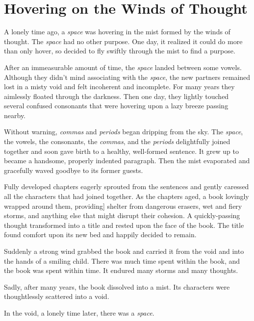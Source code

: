 \chapter{Hovering on the Winds of Thought}
\setlength{\parindent}{2em}
\LARGE
{}\baselineskip

A lonely time ago, a \textit{space} was hovering in the mist formed by the winds of thought. The \textit{space} had no other purpose. One day, it realized it could do more than only hover, so decided to fly swiftly through the mist to find a purpose.

After an immeasurable amount of time, the \textit{space} landed between some vowels. Although they didn't mind associating with the \textit{space}, the new partners remained lost in a misty void and felt incoherent and incomplete. For many years they aimlessly floated through the darkness. Then one day, they lightly touched several confused consonants that were hovering upon a lazy breeze passing nearby.

Without warning, \textit{commas} and \textit{periods} began dripping from the sky. The \textit{space}, the vowels, the consonants, the \textit{commas}, and the \textit{periods} delightfully joined together and soon gave birth to a healthy, well-formed sentence. It grew up to became a handsome, properly indented paragraph. Then the mist evaporated and gracefully waved goodbye to its former guests.

Fully developed chapters eagerly sprouted from the sentences and gently caressed all the characters that had joined together. As the chapters aged, a book lovingly wrapped around them, providing] shelter from dangerous erasers, wet and fiery storms, and anything else that might disrupt their cohesion. A quickly-passing thought transformed into a title and rested upon the face of the book. The title found comfort upon its new bed and happily decided to remain.

Suddenly a strong wind grabbed the book and carried it from the void and into the hands of a smiling child. There was much time spent within the book, and the book was spent within time. It endured many storms and many thoughts.

Sadly, after many years, the book dissolved into a mist. Its characters were thoughtlessly scattered into a void.

In the void, a lonely time later, there was a \textit{space}.
